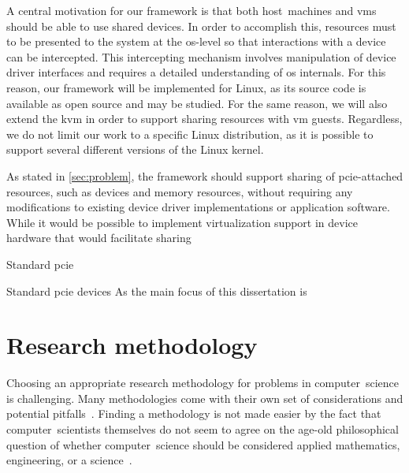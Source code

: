 A central motivation for our framework is that both \gls{host}~machines and \glspl{vm} should be able to use shared devices.
%
In order to accomplish this, resources must to be presented to the system at the \gls{os}-level so that interactions with a device can be intercepted. 
%
This intercepting mechanism involves manipulation of device driver interfaces and requires a detailed understanding of \gls{os} internals.
%
For this reason, our framework will be implemented for Linux, as its source code is available as open source and may be studied.
%
For the same reason, we will also extend the \gls{kvm} in order to support sharing resources with \gls{vm} \glspl{guest}.
%
Regardless, we do not limit our work to a specific Linux distribution, as it is possible to support several different versions of the Linux kernel.



As stated in \cref{sec:problem}, the framework should support sharing of \gls{pcie}-attached resources, such as devices and memory resources, without requiring any modifications to existing device driver implementations or application software.
%
While it would be possible to implement virtualization support in device hardware that would facilitate sharing

Standard \gls{pcie}\cite{spec:PCIe}


Standard pcie devices
As the main focus of this dissertation is 


%






\section{Research methodology}\label{sec:methodology}
Choosing an appropriate research methodology for problems in computer~science is challenging.
%
Many methodologies come with their own set of considerations and potential pitfalls~\cite{McGrath1981}.
%
Finding a methodology is not made easier by the fact that computer~scientists themselves do not seem to agree on the age-old philosophical question of whether computer~science should be considered applied mathematics, engineering, or a science~\cite{Denning2005}.



